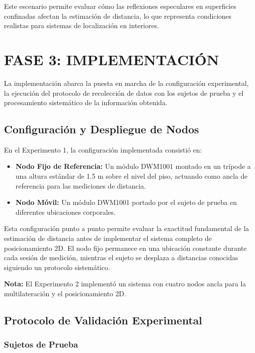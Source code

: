 Este escenario permite evaluar cómo las reflexiones especulares en superficies confinadas afectan la estimación de distancia, lo que representa condiciones realistas para sistemas de localización en interiores.

\section{FASE 3: IMPLEMENTACIÓN}
\label{sec:implementacion}

La implementación abarca la puesta en marcha de la configuración experimental, la ejecución del protocolo de recolección de datos con los sujetos de prueba y el procesamiento sistemático de la información obtenida.

\subsection{Configuración y Despliegue de Nodos}
\label{subsec:configuracion_nodos}

En el Experimento 1, la configuración implementada consistió en:

\begin{itemize}
\item \textbf{Nodo Fijo de Referencia:} Un módulo DWM1001 montado en un trípode a una altura estándar de 1.5 m sobre el nivel del piso, actuando como ancla de referencia para las mediciones de distancia.
\item \textbf{Nodo Móvil:} Un módulo DWM1001 portado por el sujeto de prueba en diferentes ubicaciones corporales.
\end{itemize}

Esta configuración punto a punto permite evaluar la exactitud fundamental de la estimación de distancia antes de implementar el sistema completo de posicionamiento 2D. El nodo fijo permanece en una ubicación constante durante cada sesión de medición, mientras el sujeto se desplaza a distancias conocidas siguiendo un protocolo sistemático.

\textbf{Nota:} El Experimento 2 implementó un sistema con cuatro nodos ancla para la multilateración y el posicionamiento 2D.

\subsection{Protocolo de Validación Experimental}
\label{subsec:protocolo_validacion}

\subsubsection{Sujetos de Prueba}

